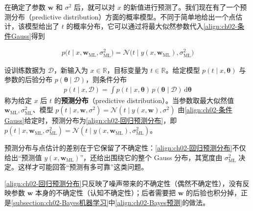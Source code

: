 \documentclass[../../main.tex]{subfiles}
\begin{document}
在确定了参数 $\mathbf{w}$ 和 $\sigma^{2}$ 后，就可以对 $x$ 的新值进行预测了。我们现在有了一个预测分布（predictive distribution）方面的概率模型。不同于简单地给出一个点估计，该模型给出了 $t$ 的概率分布，它可以通过将最大似然参数代入\eqref{align:ch02-条件Gauss}得到

\begin{align}
  p\big(t\mid x,\mathbf{w}_{\mathrm{ML}},\sigma_{\mathrm{ML}}^{2}\big) = \mathcal{N}\big(t\mid y(x,\mathbf{w}_{\mathrm{ML}}),\sigma_{\mathrm{ML}}^{2}\big)
  \label{align:ch02-回归预测分布}
\end{align}

\begin{definition}[预测分布]\label{definition:ch02-预测分布}
设训练数据为 $\mathcal{D}$，新输入为 $x\in\mathbb{R}$，目标变量为 $t\in\mathbb{R}$。给定模型 $p(t\mid x,\boldsymbol{\theta})$ 与参数的后验分布 $p(\boldsymbol{\theta}\mid\mathcal{D})$，则条件分布
\begin{align*}
  p(t\mid x,\mathcal{D})=\int p(t\mid x,\boldsymbol{\theta})\,p(\boldsymbol{\theta}\mid\mathcal{D})\,\mathrm{d}\boldsymbol{\theta}
\end{align*}
称为给定 $x$ 后 $t$ 的\textbf{预测分布}（predictive distribution）。当参数取最大似然值 $\mathbf{w}_{\mathrm{ML}},\sigma_{\mathrm{ML}}^{2}$、模型 $p(t\mid x,\mathbf{w},\sigma^{2})=\mathcal{N}(t\mid y(x,\mathbf{w}),\sigma^{2})$ 由\eqref{align:ch02-条件Gauss}给定时，预测分布为\eqref{align:ch02-回归预测分布}，即 $p(t\mid x,\mathbf{w}_{\mathrm{ML}},\sigma_{\mathrm{ML}}^{2})=\mathcal{N}(t\mid y(x,\mathbf{w}_{\mathrm{ML}}),\sigma_{\mathrm{ML}}^{2})$。
\end{definition}

\begin{remark}
预测分布与点估计的差别在于它保留了不确定性：\eqref{align:ch02-回归预测分布}不仅给出“预测值 $y(x,\mathbf{w}_{\mathrm{ML}})$”，还给出围绕它的整个 Gauss 分布，其宽度由 $\sigma_{\mathrm{ML}}^{2}$ 决定。这样才可能回答“预测有多可靠”这类问题。

\eqref{align:ch02-回归预测分布}只反映了噪声带来的不确定性（偶然不确定性），没有反映参数 $\mathbf{w}$ 本身的不确定性（认知不确定性）；后者需要把 $\mathbf{w}$ 的后验也积分掉，正是\cref{subsection:ch02-Bayes机器学习}中\eqref{align:ch02-Bayes预测}的做法。
\end{remark}
\end{document}
